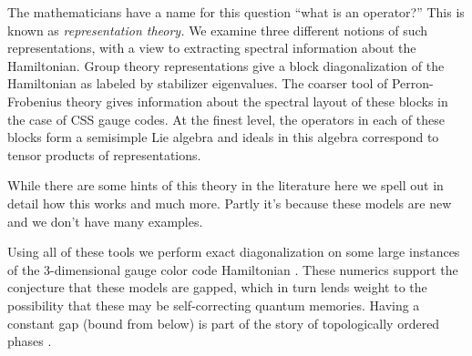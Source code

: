 \documentclass[12pt]{article}
\begin{document}
The mathematicians have a name for this question ``what is an operator?''
This is known as \emph{representation theory.}
We examine three different notions of
such representations, with a view to extracting
spectral information about the Hamiltonian.
Group theory representations give 
a block diagonalization of the Hamiltonian as labeled by stabilizer eigenvalues.
The coarser tool of Perron-Frobenius theory gives information about the
spectral layout of these blocks in the case of CSS gauge codes.
At the finest level, the operators in each of these blocks form a semisimple Lie
algebra and ideals in this algebra correspond to tensor products of
representations. 

While there are
some hints of this theory in the literature 
\cite{Bacon2006quantum,Yoshida2010} %
here we spell out in detail how this works and much more.
Partly it's because these models are new and we don't have
many examples.

Using all of these tools we 
perform exact diagonalization on some 
large instances of the 3-dimensional gauge color code 
Hamiltonian \cite{Bombin2015,Bombin2015single,Kubica2015}.
These numerics support the conjecture that these models are gapped,
which in turn lends weight to the possibility that these may
be self-correcting quantum memories.
Having a constant gap (bound from below)
is part of the story of topologically ordered phases
\cite{Kitaev2003,Brown2016}.




\end{document}
